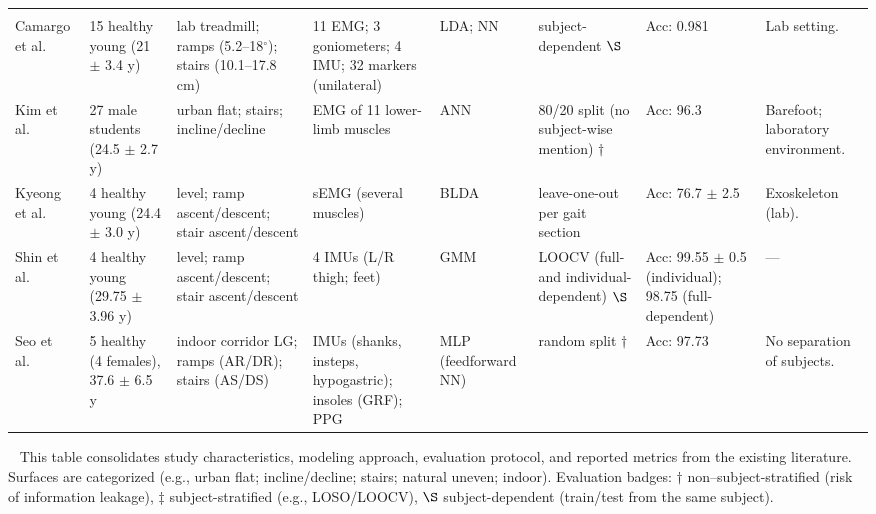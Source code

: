 \begin{landscape}
\begin{longtable}{@{}P{2.cm} P{3.cm} P{3.cm} P{3.cm} P{2.cm} P{2.5cm} P{2.5cm} P{3.cm}@{}}
\addlinespace
{}\\
\addlinespace
Camargo et al.~\cite{camargo2021machine} & 15 healthy young (21 $\pm$ 3.4 y) & lab treadmill; ramps (5.2--18$^{\circ}$); stairs (10.1--17.8 cm) & 11 EMG; 3 goniometers; 4 IMU; 32 markers (unilateral) & LDA; NN & subject-dependent \(\S\) & Acc: 0.981 & Lab setting. \\
\addlinespace
Kim et al.~\cite{kim2021classification} & 27 male students (24.5 $\pm$ 2.7 y) & urban flat; stairs; incline/decline & EMG of 11 lower-limb muscles & ANN & 80/20 split (no subject-wise mention) \(\dagger\) & Acc: 96.3 & Barefoot; laboratory environment. \\
\addlinespace
Kyeong et al.~\cite{kyeong2019recognition} & 4 healthy young (24.4 $\pm$ 3.0 y) & level; ramp ascent/descent; stair ascent/descent & sEMG (several muscles) & BLDA & leave-one-out per gait section & Acc: 76.7 $\pm$ 2.5 & Exoskeleton (lab). \\
\addlinespace
Shin et al.~\cite{shin2021locomotion} & 4 healthy young (29.75 $\pm$ 3.96 y) & level; ramp ascent/descent; stair ascent/descent & 4 IMUs (L/R thigh; feet) & GMM & LOOCV (full- and individual-dependent) \(\S\) & Acc: 99.55 $\pm$ 0.5 (individual); 98.75 (full-dependent) & --- \\
\addlinespace
Seo et al.~\cite{seo2025gait} & 5 healthy (4 females), 37.6 $\pm$ 6.5 y & indoor corridor LG; ramps (AR/DR); stairs (AS/DS) & IMUs (shanks, insteps, hypogastric); insoles (GRF); PPG & MLP (feedforward NN) & random split \(\dagger\) & Acc: 97.73 & No separation of subjects. \\

\end{longtable}

\vspace{6pt}
\noindent\ %
This table consolidates study characteristics, modeling approach, evaluation protocol, and reported metrics from the existing literature. Surfaces are categorized (e.g., urban flat; incline/decline; stairs; natural uneven; indoor). Evaluation badges: \textbf{\(\dagger\)} non--subject-stratified (risk of information leakage), \textbf{\(\ddagger\)} subject-stratified (e.g., LOSO/LOOCV), \textbf{\(\S\)} subject-dependent (train/test from the same subject).
\end{landscape}

